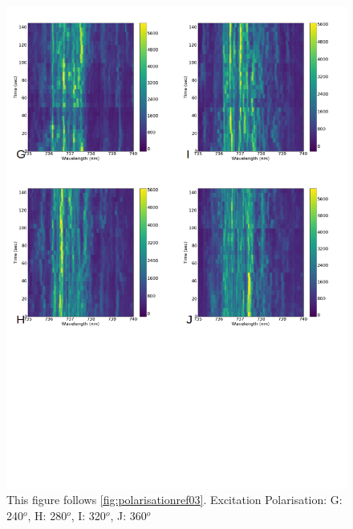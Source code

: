 \begin{figure}[h]
\centering
\includegraphics[width=1\linewidth]{Figures/pic/polarisationref03_2}
\caption{This figure follows \ref{fig:polarisationref03}. Excitation Polarisation: G: 240$^{o}$, H: 280$^{o}$, I: 320$^{o}$, J: 360$^{o}$ }
\label{fig:polarisationref032}
\end{figure}


